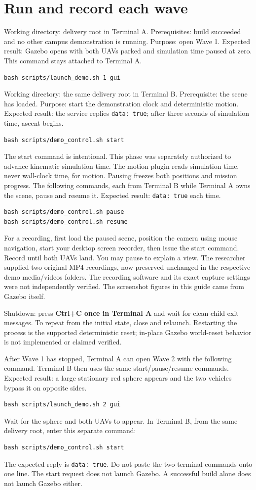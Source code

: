 \section{Run and record each wave}
Working directory: delivery root in Terminal A. Prerequisites: build succeeded and no other campus demonstration is running. Purpose: open Wave 1. Expected result: Gazebo opens with both UAVs parked and simulation time paused at zero. This command stays attached to Terminal A.
\begin{lstlisting}
bash scripts/launch_demo.sh 1 gui
\end{lstlisting}
Working directory: the same delivery root in Terminal B. Prerequisite: the scene has loaded. Purpose: start the demonstration clock and deterministic motion. Expected result: the service replies \texttt{data: true}; after three seconds of simulation time, ascent begins.
\begin{lstlisting}
bash scripts/demo_control.sh start
\end{lstlisting}
The start command is intentional. This phase was separately authorized to advance kinematic simulation time. The motion plugin reads simulation time, never wall-clock time, for motion. Pausing freezes both positions and mission progress. The following commands, each from Terminal B while Terminal A owns the scene, pause and resume it. Expected result: \texttt{data: true} each time.
\begin{lstlisting}
bash scripts/demo_control.sh pause
bash scripts/demo_control.sh resume
\end{lstlisting}
For a recording, first load the paused scene, position the camera using mouse navigation, start your desktop screen recorder, then issue the start command. Record until both UAVs land. You may pause to explain a view. The researcher supplied two original MP4 recordings, now preserved unchanged in the respective demo media/videos folders. The recording software and its exact capture settings were not independently verified. The screenshot figures in this guide came from Gazebo itself.

Shutdown: press \textbf{Ctrl+C once in Terminal A} and wait for clean child exit messages. To repeat from the initial state, close and relaunch. Restarting the process is the supported deterministic reset; in-place Gazebo world-reset behavior is not implemented or claimed verified.

After Wave 1 has stopped, Terminal A can open Wave 2 with the following command. Terminal B then uses the same start/pause/resume commands. Expected result: a large stationary red sphere appears and the two vehicles bypass it on opposite sides.
\begin{lstlisting}
bash scripts/launch_demo.sh 2 gui
\end{lstlisting}
Wait for the sphere and both UAVs to appear. In Terminal B, from the same delivery root, enter this separate command:
\begin{lstlisting}
bash scripts/demo_control.sh start
\end{lstlisting}
The expected reply is \texttt{data: true}. Do not paste the two terminal commands onto one line. The start request does not launch Gazebo. A successful build alone does not launch Gazebo either.

